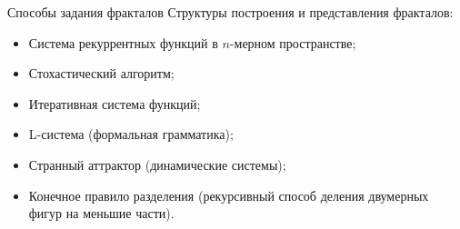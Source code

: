 \documentclass{beamer}
\begin{document}
\begin{frame}{Способы задания фракталов}
	Структуры построения и представления фракталов:

	\begin{itemize}
		\item Система рекуррентных функций в $n$-мерном пространстве;
		\item Стохастический алгоритм;
		\item Итеративная система функций;
		\item L-система (формальная грамматика);
		\item Странный аттрактор (динамические системы);
		\item Конечное правило разделения (рекурсивный способ деления двумерных фигур на меньшие части).
	\end{itemize}

	\note{

	}
\end{frame}
\end{document}
